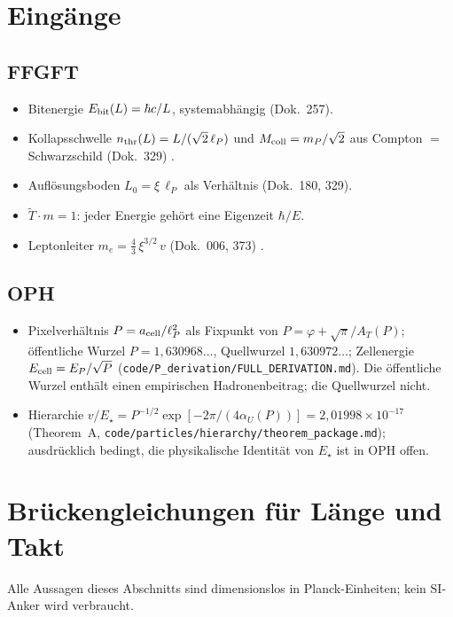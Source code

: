 \section{Eingänge}

\subsection*{FFGFT}
\begin{itemize}\itemsep2pt
\item Bitenergie $E_{\rm bit}(L)=\hbar c/L$, systemabhängig (Dok.~257).
\item Kollapsschwelle $n_{\rm thr}(L)=L/(\sqrt2\,\ell_P)$ und
  $M_{\rm coll}=m_P/\sqrt2$ aus Compton $=$ Schwarzschild (Dok.~329) \BM.
\item Auflösungsboden $L_0=\xi\,\ell_P$ als Verhältnis (Dok.~180, 329).
\item $\tilde T\cdot m=1$: jeder Energie gehört eine Eigenzeit $\hbar/E$.
\item Leptonleiter $m_e=\tfrac43\,\xi^{3/2}\,v$ (Dok.~006, 373) \KM.
\end{itemize}

\subsection*{OPH \QM}
\begin{itemize}\itemsep2pt
\item Pixelverhältnis $P=a_{\rm cell}/\ell_P^2$ als Fixpunkt von
  $P=\varphi+\sqrt\pi/A_T(P)$; öffentliche Wurzel $P=1{,}630968\ldots$,
  Quellwurzel $1{,}630972\ldots$; Zellenergie $E_{\rm cell}=E_P/\sqrt P$
  (\texttt{code/P\_derivation/FULL\_DERIVATION.md}). Die öffentliche Wurzel
  enthält einen empirischen Hadronenbeitrag; die Quellwurzel nicht.
\item Hierarchie $v/E_\star=P^{-1/2}\exp[-2\pi/(4\alpha_U(P))]
  =2{,}01998\times10^{-17}$ (Theorem~A,
  \texttt{code/particles/hierarchy/theorem\_package.md}); ausdrücklich
  bedingt, die physikalische Identität von $E_\star$ ist in OPH offen.
\end{itemize}

\section{Brückengleichungen für Länge und Takt}\label{sec:bruecke}

Alle Aussagen dieses Abschnitts sind dimensionslos in Planck-Einheiten; kein
SI-Anker wird verbraucht.

